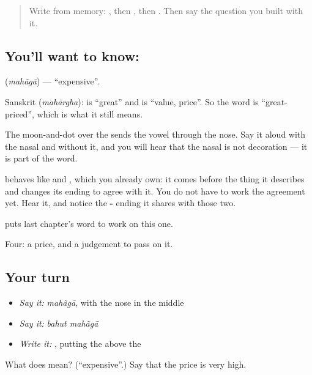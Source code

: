 \begin{quote}
Write \textbf{} from memory: , then , then . Then say the question you built with it.
\end{quote}

\subsection*{You'll want to know: }
\textbf{} (\emph{mahãgā}) — \textquotedblleft{}expensive\textquotedblright{}.

Sanskrit  (\emph{mahārgha}): \textbf{} is \textquotedblleft{}great\textquotedblright{} and \textbf{} is \textquotedblleft{}value, price\textquotedblright{}. So the word is \textquotedblleft{}great-priced\textquotedblright{}, which is what it still means.

The moon-and-dot  over the  sends the vowel through the nose. Say it aloud with the nasal and without it, and you will hear that the nasal is not decoration — it is part of the word.

 behaves like \textbf{} and \textbf{}, which you already own: it comes before the thing it describes and changes its ending to agree with it. You do not have to work the agreement yet. Hear it, and notice the \textbf{-} ending it shares with those two.

\textbf{ } puts last chapter's word to work on this one.

\begin{grammarlens}[title={What you've built}]
Four: a price, and a judgement to pass on it.
\end{grammarlens}

\subsection*{Your turn}
\begin{itemize}
\raggedright
  \item \emph{Say it:} \emph{mahãgā}, with the nose in the middle
  \item \emph{Say it:} \emph{bahut mahãgā}
  \item \emph{Write it:} , putting the  above the 
\end{itemize}

\begin{tcolorbox}[breakable,colback=teal!4,colframe=teal!35!black,title={Before you move on}]
What does  mean? (\textquotedblleft{}expensive\textquotedblright{}.) Say that the price is very high.
\end{tcolorbox}
